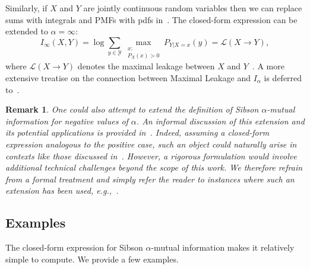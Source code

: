 \documentclass{article}
\numberwithin{theorem}{section}
\numberwithin{example}{section}
\newtheorem{remark}{Remark}
\numberwithin{remark}{section}
\numberwithin{definition}{section}
\newcommand{\E}{\mathbb{E}}
\DeclareMathOperator*{\esssup}{ess\,sup}
\newcommand{\Y}{\mathcal{Y}}
\newcommand{\ml}[2]{\mathcal{L}\left(#1  \!\!  \to  \!\!   #2\right)} %
\begin{document}
Similarly, if $X$ and $Y$ are jointly continuous random variables then we can replace sums with integrals and PMFs with pdfs in~.
The closed-form expression can be extended to $\alpha=\infty$:
\begin{equation}
    I_{\infty}(X,Y) = \log \sum_{y\in \Y} \max_{\substack{x:\\ P_X(x)>0}} P_{Y|X=x}(y) = \ml{X}{Y}, \label{eq-def-maxleakage}
\end{equation}
where $\ml{X}{Y}$ denotes the maximal leakage between $X$ and $Y$~\cite{MaximalLeakage:20}. A more extensive treatise on the connection between Maximal Leakage and $I_\alpha$ is deferred to~.
\begin{remark}
    One could also attempt to extend the definition of Sibson $\alpha$-mutual information for negative values of $\alpha$. An informal discussion of this extension and its potential applications is provided in~.  Indeed, assuming a closed-form expression analogous to the positive case, such an object could naturally arise in contexts like those discussed in~. However, a rigorous formulation would involve additional technical challenges beyond the scope of this work. We therefore refrain from a formal treatment and simply refer the reader to instances where such an extension has been used, \textit{e.g.},~\cite[Appendix D.2]{EspositoVG:23}.
\end{remark}




\subsection{Examples}

The closed-form expression for Sibson $\alpha$-mutual information makes it relatively simple to compute. We provide a few examples.
\end{document}
